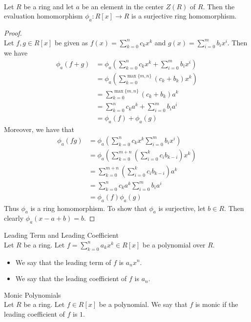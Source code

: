\documentclass[a4paper]{article}
\begin{document}
\begin{prp}{}{}\\
Let $R$ be a ring and let $a$ be an element in the center $Z(R)$ of $R$. Then the evaluation homomorphism $\phi_a:R[x]\to R$ is a surjective ring homomorphism. 
\begin{proof}\\
Let $f,g\in R[x]$ be given as $f(x)=\sum_{k=0}^nc_kx^k$ and $g(x)=\sum_{i=0}^mb_ix^i$. Then we have 
\begin{align*}
\phi_a(f+g)&=\phi_a\left(\sum_{k=0}^nc_kx^k+\sum_{i=0}^mb_ix^i\right)\\
&=\phi_a\left(\sum_{k=0}^{\max\{m,n\}}(c_k+b_k)x^k\right)\\
&=\sum_{k=0}^{\max\{m,n\}}(c_k+b_k)a^k\\
&=\sum_{k=0}^nc_ka^k+\sum_{i=0}^mb_ia^i\\
&=\phi_a(f)+\phi_a(g)
\end{align*}
Moreover, we have that 
\begin{align*}
\phi_a(fg)&=\phi_a\left(\sum_{k=0}^nc_kx^k\sum_{i=0}^mb_ix^i\right)\\
&=\phi_a\left(\sum_{k=0}^{m+n}\left(\sum_{i=0}^kc_ib_{k-i}\right)x^k\right)\\
&=\sum_{k=0}^{m+n}\left(\sum_{i=0}^kc_ib_{k-i}\right)a^k\\
&=\sum_{k=0}^nc_ka^k\sum_{i=0}^mb_ia^i\tag{$a\in Z(R)$}\\
&=\phi_a(f)\phi_a(g)
\end{align*}
Thus $\phi_a$ is a ring homomorphism. To show that $\phi_a$ is surjective, let $b\in R$. Then clearly $\phi_a(x-a+b)=b$. 
\end{proof}
\end{prp}

\begin{defn}{Leading Term and Leading Coefficient}{}\\
Let $R$ be a ring. Let $f=\sum_{k=0}^na_kx^k\in R[x]$ be a polynomial over $R$. 
\begin{itemize}
\item We say that the leading term of $f$ is $a_nx^n$. 
\item We say that the leading coefficient of $f$ is $a_n$. 
\end{itemize}
\end{defn}

\begin{defn}{Monic Polynomials}{}\\
Let $R$ be a ring. Let $f\in R[x]$ be a polynomial. We say that $f$ is monic if the leading coefficient of $f$ is $1$. 
\end{defn}
\end{document}
